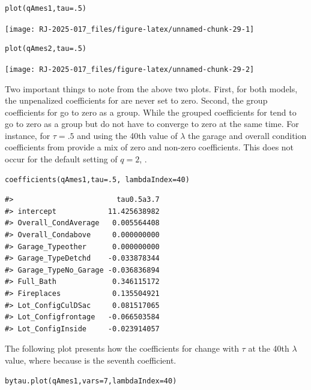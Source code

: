 \begin{verbatim}
plot(qAmes1,tau=.5)
\end{verbatim}

\begin{center}\texttt{[image: RJ-2025-017\_files/figure-latex/unnamed-chunk-29-1]} \end{center}

\begin{verbatim}
plot(qAmes2,tau=.5)
\end{verbatim}

\begin{center}\texttt{[image: RJ-2025-017\_files/figure-latex/unnamed-chunk-29-2]} \end{center}

Two important things to note from the above two plots. First, for both models, the unpenalized coefficients for  are never set to zero. Second, the group coefficients for  go to zero as a group. While the grouped coefficients for  tend to go to zero as a group but do not have to converge to zero at the same time. For instance, for \(\tau=.5\) and using the 40th value of \(\lambda\) the garage and overall condition coefficients from  provide a mix of zero and non-zero coefficients. This does not occur for the default setting of \(q=2\), .

\begin{verbatim}
coefficients(qAmes1,tau=.5, lambdaIndex=40)
\end{verbatim}

\begin{verbatim}
#>                        tau0.5a3.7
#> intercept            11.425638982
#> Overall_CondAverage   0.005564408
#> Overall_Condabove     0.000000000
#> Garage_Typeother      0.000000000
#> Garage_TypeDetchd    -0.033878344
#> Garage_TypeNo_Garage -0.036836894
#> Full_Bath             0.346115172
#> Fireplaces            0.135504921
#> Lot_ConfigCulDSac     0.081517065
#> Lot_Configfrontage   -0.066503584
#> Lot_ConfigInside     -0.023914057
\end{verbatim}

The following plot presents how the coefficients for  change with \(\tau\) at the 40th \(\lambda\) value, where  because  is the seventh coefficient.

\begin{verbatim}
bytau.plot(qAmes1,vars=7,lambdaIndex=40)
\end{verbatim}

